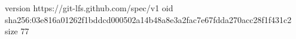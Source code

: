 version https://git-lfs.github.com/spec/v1
oid sha256:03e816a01262f1bddcd000502a14b48a8e3a2fac7e67fdda270acc28f1f431c2
size 77
